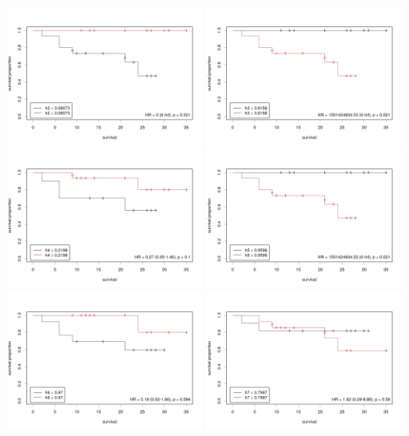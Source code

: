 \documentclass{article}
\begin{document}
  \includegraphics[width=65mm]{plots/h2.jpg} \includegraphics[width=65mm]{plots/h3.jpg} \\
  \includegraphics[width=65mm]{plots/h4.jpg} \includegraphics[width=65mm]{plots/h5.jpg} \\
  \includegraphics[width=65mm]{plots/h6.jpg} \includegraphics[width=65mm]{plots/h7.jpg} \\
\end{document}
